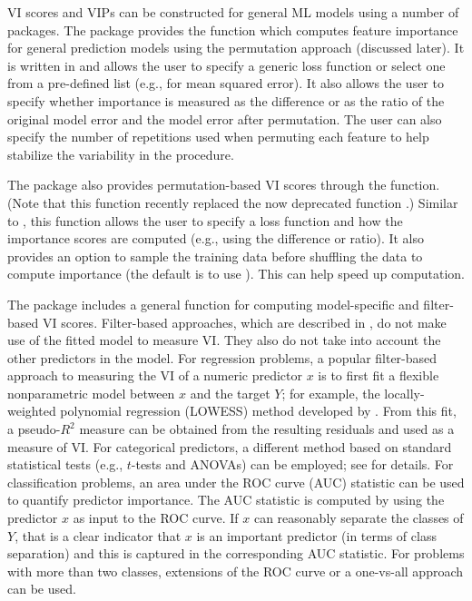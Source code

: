 VI scores and VIPs can be constructed for general ML models using a
number of packages. The  package \citep{iml-pkg} provides
the  function which computes feature importance for
general prediction models using the permutation approach (discussed
later). It is written in  \citep{R6-pkg} and allows the user
to specify a generic loss function or select one from a pre-defined list
(e.g.,  for mean squared error). It also allows the
user to specify whether importance is measured as the difference or as
the ratio of the original model error and the model error after
permutation. The user can also specify the number of repetitions used
when permuting each feature to help stabilize the variability in the
procedure.

The  package \citep{ingredients-pkg} also provides
permutation-based VI scores through the 
function. (Note that this function recently replaced the now deprecated
 function 
\citep{DALEX-pkg}.) Similar to , this function
allows the user to specify a loss function and how the importance scores
are computed (e.g., using the difference or ratio). It also provides an
option to sample the training data before shuffling the data to compute
importance (the default is to use ). This can
help speed up computation.

The  package \citep{caret-pkg} includes a general
 function for computing model-specific and filter-based
VI scores. Filter-based approaches, which are described in
\citet{applied-kuhn-2013}, do not make use of the fitted model to
measure VI. They also do not take into account the other predictors in
the model. For regression problems, a popular filter-based approach to
measuring the VI of a numeric predictor \(x\) is to first fit a flexible
nonparametric model between \(x\) and the target \(Y\); for example, the
locally-weighted polynomial regression (LOWESS) method developed by
\citet{robust-cleveland-1979}. From this fit, a pseudo-\(R^2\) measure
can be obtained from the resulting residuals and used as a measure of
VI. For categorical predictors, a different method based on standard
statistical tests (e.g., \(t\)-tests and ANOVAs) can be employed; see
\citet{applied-kuhn-2013} for details. For classification problems, an
area under the ROC curve (AUC) statistic can be used to quantify
predictor importance. The AUC statistic is computed by using the
predictor \(x\) as input to the ROC curve. If \(x\) can reasonably
separate the classes of \(Y\), that is a clear indicator that \(x\) is
an important predictor (in terms of class separation) and this is
captured in the corresponding AUC statistic. For problems with more than
two classes, extensions of the ROC curve or a one-vs-all approach can be
used.

